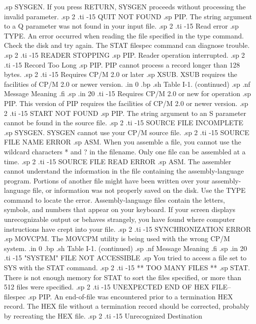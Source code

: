 .sp
SYSGEN.  If you press RETURN, SYSGEN proceeds without processing 
the invalid parameter.
.sp 2
.ti -15
QUIT NOT FOUND
.sp
PIP.  The string argument to a Q parameter was not found in your 
input file.
.sp 2
.ti -15
Read error
.sp
TYPE.  An error occurred when reading the file specified in the 
type command.  Check the disk and try again.  The STAT filespec 
command can diagnose trouble.
.sp 2
.ti -15
READER STOPPING
.sp
PIP.  Reader operation interrupted.
.sp 2
.ti -15
Record Too Long
.sp 
PIP.  PIP cannot process a record longer than 128 bytes.
.sp 2
.ti -15
Requires CP/M 2.0 or later
.sp
XSUB.  XSUB requires the facilities of CP/M 2.0 or newer version.
.in 0
.bp
.sh
                     Table I-1.  (continued)
.sp
.nf
     Message        Meaning
.fi
.sp
.in 20
.ti -15
Requires CP/M 2.0 or new for operation
.sp
PIP.  This version of PIP requires the facilities of CP/M 2.0 or 
newer version.
.sp 2
.ti -15
START NOT FOUND
.sp
PIP.  The string argument to an S parameter cannot be found in 
the source file.
.sp 2
.ti -15
SOURCE FILE INCOMPLETE
.sp
SYSGEN.  SYSGEN cannot use your CP/M source file.
.sp 2
.ti -15
SOURCE FILE NAME ERROR
.sp
ASM.  When you assemble a file, you cannot use the wildcard 
characters * and ? in the filename. Only one file can be 
assembled at a time.
.sp 2
.ti -15
SOURCE FILE READ ERROR
.sp
ASM.  The assembler cannot understand the information in the file 
containing the assembly-language program.  Portions of another 
file might have been written over your assembly-language file, or 
information was not properly saved on the disk.  Use the TYPE 
command to locate the error.  Assembly-language files contain the 
letters, symbols, and numbers that appear on your keyboard.  If 
your screen displays unrecognizable output or behaves strangely, 
you have found where computer instructions have crept into your 
file.
.sp 2
.ti -15
SYNCHRONIZATION ERROR
.sp
MOVCPM.  The MOVCPM utility is being used with the wrong CP/M 
system.
.in 0
.bp
.sh
                     Table I-1.  (continued)
.sp
.nf
     Message        Meaning
.fi
.sp
.in 20
.ti -15
"SYSTEM" FILE NOT ACCESSIBLE
.sp 
You tried to access a file set to SYS with the STAT command.
.sp 2
.ti -15
** TOO MANY FILES **
.sp
STAT.  There is not enough memory for STAT to sort the files 
specified, or more than 512 files were specified.
.sp 2
.ti -15
UNEXPECTED END OF HEX FILE--{filespec}
.sp
PIP.  An end-of-file was encountered prior to a termination HEX 
record.  The HEX file without a termination record should be 
corrected, probably by recreating the HEX file.
.sp 2
.ti -15
Unrecognized Destination
